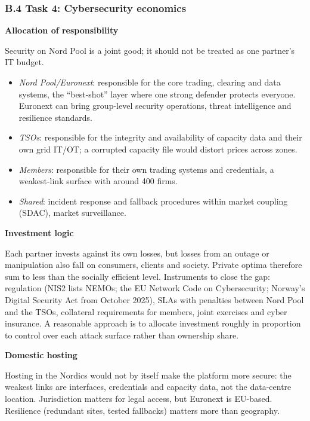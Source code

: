 \subsubsection*{B.4 Task 4: Cybersecurity economics}
\label{app:B4}
\begin{aiout}
\textbf{Allocation of responsibility}

Security on Nord Pool is a joint good; it should not be treated as one partner's IT budget.
\begin{itemize}
  \item \emph{Nord Pool/Euronext}: responsible for the core trading, clearing and data systems, the ``best-shot'' layer where one strong defender protects everyone. Euronext can bring group-level security operations, threat intelligence and resilience standards.
  \item \emph{TSOs}: responsible for the integrity and availability of capacity data and their own grid IT/OT; a corrupted capacity file would distort prices across zones.
  \item \emph{Members}: responsible for their own trading systems and credentials, a weakest-link surface with around 400 firms.
  \item \emph{Shared}: incident response and fallback procedures within market coupling (SDAC), market surveillance.
\end{itemize}
\textbf{Investment logic}

Each partner invests against its own losses, but losses from an outage or manipulation also fall on consumers, clients and society. Private optima therefore sum to less than the socially efficient level. Instruments to close the gap: regulation (NIS2 lists NEMOs; the EU Network Code on Cybersecurity; Norway's Digital Security Act from October 2025), SLAs with penalties between Nord Pool and the TSOs, collateral requirements for members, joint exercises and cyber insurance. A reasonable approach is to allocate investment roughly in proportion to control over each attack surface rather than ownership share.

\textbf{Domestic hosting}

Hosting in the Nordics would not by itself make the platform more secure: the weakest links are interfaces, credentials and capacity data, not the data-centre location. Jurisdiction matters for legal access, but Euronext is EU-based. Resilience (redundant sites, tested fallbacks) matters more than geography.
\end{aiout}

